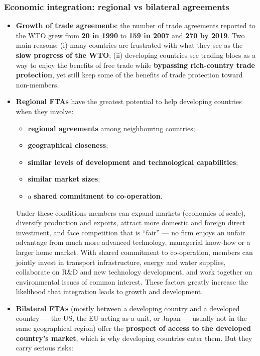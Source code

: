 \documentclass[a4paper,12pt]{article}
\begin{document}
\subsubsection*{Economic integration: regional vs bilateral agreements}
\begin{itemize}
  \item \textbf{Growth of trade agreements}: the number of trade agreements reported to the WTO grew from \textbf{20 in 1990} to \textbf{159 in 2007} and \textbf{270 by 2019}. Two main reasons: (i) many countries are frustrated with what they see as the \textbf{slow progress of the WTO}; (ii) developing countries see trading blocs as a way to enjoy the benefits of free trade while \textbf{bypassing rich-country trade protection}, yet still keep some of the benefits of trade protection toward non-members.
  \item \textbf{Regional FTAs} have the greatest potential to help developing countries when they involve:
  \begin{itemize}
    \item \textbf{regional agreements} among neighbouring countries;
    \item \textbf{geographical closeness};
    \item \textbf{similar levels of development and technological capabilities};
    \item \textbf{similar market sizes};
    \item a \textbf{shared commitment to co-operation}.
  \end{itemize}
  Under these conditions members can expand markets (economies of scale), diversify production and exports, attract more domestic and foreign direct investment, and face competition that is ``fair'' --- no firm enjoys an unfair advantage from much more advanced technology, managerial know-how or a larger home market. With shared commitment to co-operation, members can jointly invest in transport infrastructure, energy and water supplies, collaborate on R\&D and new technology development, and work together on environmental issues of common interest. These factors greatly increase the likelihood that integration leads to growth and development. 
  \item \textbf{Bilateral FTAs} (mostly between a developing country and a developed country --- the US, the EU acting as a unit, or Japan --- usually not in the same geographical region) offer the \textbf{prospect of access to the developed country's market}, which is why developing countries enter them. But they carry serious risks:

\end{itemize}
\end{document}
